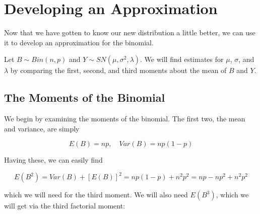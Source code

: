 \section{Developing an Approximation}

Now that we have gotten to know our new distribution a little better, we can
use it to develop an approximation for the binomial.

Let $B \sim Bin(n, p)$ and $Y \sim SN(\mu, \sigma^2, \lambda)$. We will find
estimates for $\mu$, $\sigma$, and $\lambda$ by comparing the first, second,
and third moments about the mean of $B$ and $Y$.

\subsection{The Moments of the Binomial}

We begin by examining the moments of the binomial. The first two, the mean and
variance, are simply

\begin{equation*}
  E(B) = np, \quad Var(B) = np(1-p)
\end{equation*}

Having these, we can easily find

\begin{equation*}
  E(B^2) = Var(B) + [E(B)]^2 = np(1-p) + n^2p^2 = np - np^2 + n^2p^2
\end{equation*}

which we will need for the third moment. We will also need $E(B^3)$, which we
will get via the third factorial moment:

